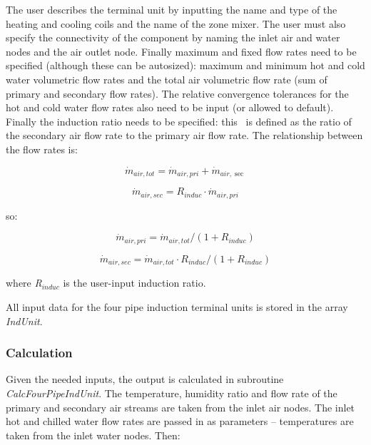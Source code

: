 The user describes the terminal unit by inputting the name and type of the heating and cooling coils and the name of the zone mixer. The user must also specify the connectivity of the component by naming the inlet air and water nodes and the air outlet node. Finally maximum and fixed flow rates need to be specified (although these can be autosized): maximum and minimum hot and cold water volumetric flow rates and the total air volumetric flow rate (sum of primary and secondary flow rates). The relative convergence tolerances for the hot and cold water flow rates also need to be input (or allowed to default). Finally the induction ratio needs to be specified: this~ is defined as the ratio of the secondary air flow rate to the primary air flow rate. The relationship between the flow rates is:

\begin{equation}
{\dot m_{air,tot}} = {\dot m_{air,pri}} + {\dot m_{air,\sec }}
\end{equation}

\begin{equation}
{\dot m_{air,sec}} = {R_{induc}}\cdot {\dot m_{air,pri}}
\end{equation}

so:

\begin{equation}
{\dot m_{air,pri}} = {\dot m_{air,tot}}/(1 + {R_{induc}})
\end{equation}

\begin{equation}
{\dot m_{air,sec}} = {\dot m_{air,tot}}\cdot {R_{induc}}/(1 + {R_{induc}})
\end{equation}

where \emph{R\(_{induc}\)} is the user-input induction ratio.

All input data for the four pipe induction terminal units is stored in the array \emph{IndUnit}.

\subsubsection{Calculation}\label{calculation}

Given the needed inputs, the output is calculated in subroutine \emph{CalcFourPipeIndUnit}. The temperature, humidity ratio and flow rate of the primary and secondary air streams are taken from the inlet air nodes. The inlet hot and chilled water flow rates are passed in as parameters -- temperatures are taken from the inlet water nodes. Then:

